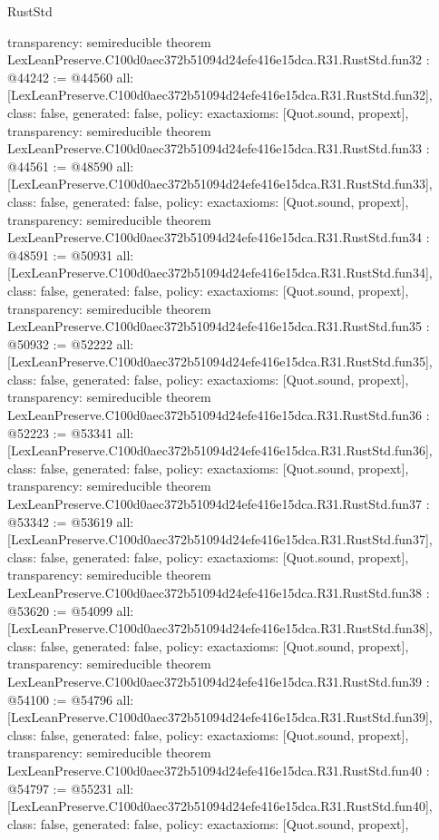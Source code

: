\begin{lexlean}{RustStd}
\begin{coremodule}
{  transparency: semireducible
}
theorem LexLeanPreserve.C100d0aec372b51094d24efe416e15dca.R31.RustStd.fun32 : @44242 := @44560 {
  all: [LexLeanPreserve.C100d0aec372b51094d24efe416e15dca.R31.RustStd.fun32],
  class: false,
  generated: false,
  policy: exact{axioms: [Quot.sound, propext]},
  transparency: semireducible
}
theorem LexLeanPreserve.C100d0aec372b51094d24efe416e15dca.R31.RustStd.fun33 : @44561 := @48590 {
  all: [LexLeanPreserve.C100d0aec372b51094d24efe416e15dca.R31.RustStd.fun33],
  class: false,
  generated: false,
  policy: exact{axioms: [Quot.sound, propext]},
  transparency: semireducible
}
theorem LexLeanPreserve.C100d0aec372b51094d24efe416e15dca.R31.RustStd.fun34 : @48591 := @50931 {
  all: [LexLeanPreserve.C100d0aec372b51094d24efe416e15dca.R31.RustStd.fun34],
  class: false,
  generated: false,
  policy: exact{axioms: [Quot.sound, propext]},
  transparency: semireducible
}
theorem LexLeanPreserve.C100d0aec372b51094d24efe416e15dca.R31.RustStd.fun35 : @50932 := @52222 {
  all: [LexLeanPreserve.C100d0aec372b51094d24efe416e15dca.R31.RustStd.fun35],
  class: false,
  generated: false,
  policy: exact{axioms: [Quot.sound, propext]},
  transparency: semireducible
}
theorem LexLeanPreserve.C100d0aec372b51094d24efe416e15dca.R31.RustStd.fun36 : @52223 := @53341 {
  all: [LexLeanPreserve.C100d0aec372b51094d24efe416e15dca.R31.RustStd.fun36],
  class: false,
  generated: false,
  policy: exact{axioms: [Quot.sound, propext]},
  transparency: semireducible
}
theorem LexLeanPreserve.C100d0aec372b51094d24efe416e15dca.R31.RustStd.fun37 : @53342 := @53619 {
  all: [LexLeanPreserve.C100d0aec372b51094d24efe416e15dca.R31.RustStd.fun37],
  class: false,
  generated: false,
  policy: exact{axioms: [Quot.sound, propext]},
  transparency: semireducible
}
theorem LexLeanPreserve.C100d0aec372b51094d24efe416e15dca.R31.RustStd.fun38 : @53620 := @54099 {
  all: [LexLeanPreserve.C100d0aec372b51094d24efe416e15dca.R31.RustStd.fun38],
  class: false,
  generated: false,
  policy: exact{axioms: [Quot.sound, propext]},
  transparency: semireducible
}
theorem LexLeanPreserve.C100d0aec372b51094d24efe416e15dca.R31.RustStd.fun39 : @54100 := @54796 {
  all: [LexLeanPreserve.C100d0aec372b51094d24efe416e15dca.R31.RustStd.fun39],
  class: false,
  generated: false,
  policy: exact{axioms: [Quot.sound, propext]},
  transparency: semireducible
}
theorem LexLeanPreserve.C100d0aec372b51094d24efe416e15dca.R31.RustStd.fun40 : @54797 := @55231 {
  all: [LexLeanPreserve.C100d0aec372b51094d24efe416e15dca.R31.RustStd.fun40],
  class: false,
  generated: false,
  policy: exact{axioms: [Quot.sound, propext]},
}
\end{coremodule}
\end{lexlean}
